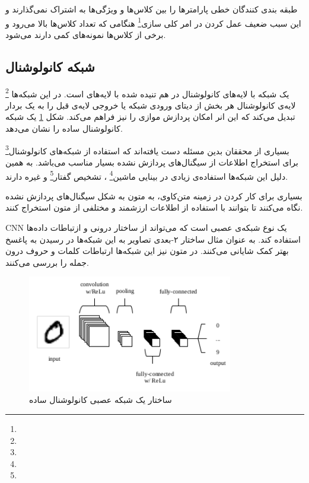\documentclass[12pt, a4paper, oneside]{report}
\begin{document}
طبقه بندی کنندگان خطی پارامترها را بین کلاس‌ها و ویژگی‌ها به اشتراک نمی‌گذارند و این سبب ضعیف عمل
کردن در امر
کلی سازی\footnote{}
هنگامی که تعداد کلاس‌ها بالا می‌رود و برخی از کلاس‌ها نمونه‌های کمی دارند می‌شود.

\subsection{شبکه کانولوشنال}

\footnote{}
یک شبکه
با لایه‌های کانولوشنال در هم تنیده شده با لایه‌های
است. در این شبکه‌ها لایه‌ی کانولوشنال هر بخش از دیتای ورودی شبکه یا خروجی لایه‌ی قبل را به یک بردار 
تبدیل می‌کند که این انر امکان پردازش موازی را نیز فراهم می‌کند\cite{iyyer-etal-2015-deep}. شکل
\ref{fig:cnn}
یک شبکه کانولوشنال ساده را نشان می‌دهد.

بسیاری از محققان بدین مسئله دست یافته‌اند که استفاده از 
شبکه‌های کانولوشنال\footnote{}
برای استخراج اطلاعات از سیگنال‌های پردازش نشده بسیار مناسب می‌باشد. به همین دلیل این شبکه‌ها
استفاده‌ی زیادی در
بینایی ماشین\footnote{}
،
تشخیص گفتار\footnote{}
و غیره دارند\cite{c9d4fbeac7324056bed5d1cb262a7268}.

بسیاری برای کار کردن در زمینه متن‌کاوی، به متون به شکل سیگنال‌های پردازش نشده نگاه می‌کنند
تا بتوانند با استفاده از
اطلاعات ارزشمند و مختلفی از متون استخراج کنند\cite{c9d4fbeac7324056bed5d1cb262a7268}.

CNN 
یک نوع شبکه‌ی عصبی است که می‌تواند از ساختار درونی و ازتباطات داده‌ها استفاده کند.
به عنوان مثال ساختار ۲-بعدی تصاویر به این شبکه‌ها در رسیدن به پاغسخ بهتر کمک شایانی می‌کنند.
در متون نیز این شبکه‌ها ارتباطات کلمات و حروف درون جمله را بررسی می‌کنند.
\cite{johnson-zhang-2015-effective}

\begin{figure}[!ht]
    \centering
    \includegraphics[width=0.80\textwidth]{CNN}
    \caption{ساختار یک شبکه عصبی کانولوشنال ساده}
    \label{fig:cnn}
\end{figure}
\end{document}
